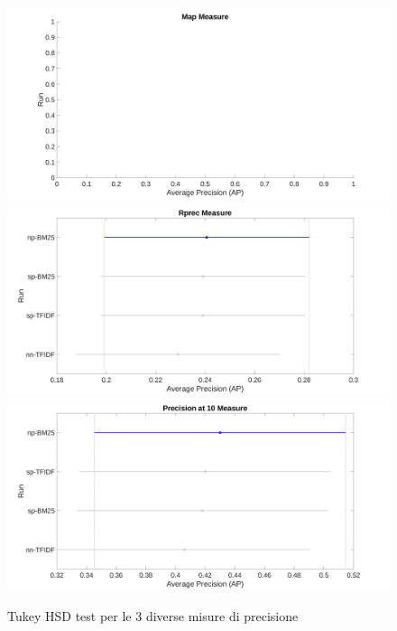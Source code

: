 \documentclass[a4paper, 11pt]{article}
\begin{document}
\begin{figure}[!htb]
  \includegraphics[width=\linewidth]{../Plots/mean-tukey.jpeg}
\endminipage\hfill
{}
  \includegraphics[width=\linewidth]{../Plots/rprec-tukey.jpeg}
\endminipage\hfill
{}%
  \includegraphics[width=\linewidth]{../Plots/p10-tukey.jpeg}
\endminipage
\caption{Tukey HSD test per le 3 diverse misure di precisione}

\end{figure}
\end{document}
